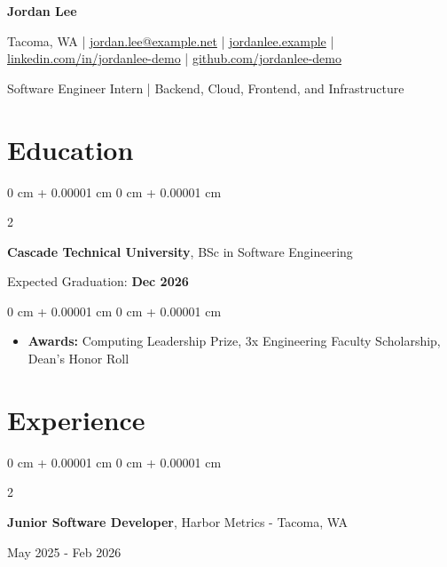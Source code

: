 \documentclass[10pt, letterpaper]{article}
\newenvironment{onecolentry}{
    \begin{adjustwidth}{
        0 cm + 0.00001 cm
    }{
        0 cm + 0.00001 cm
    }
}{
    \end{adjustwidth}
}
\newenvironment{twocolentry}[2][]{
    \onecolentry
    \def\secondColumn{#2}
    \setcolumnwidth{\fill, 6 cm}
    \begin{paracol}{2}
}{
    \switchcolumn \raggedleft \secondColumn
    \end{paracol}
    \endonecolentry
}
\begin{document}
    \begin{center}
        {\fontsize{24pt}{24pt}\selectfont\textbf{Jordan Lee}}

        \vspace{0.2cm}

        Tacoma, WA | \href{mailto:jordan.lee@example.net}{jordan.lee@example.net} | \href{https://jordanlee.example}{jordanlee.example} | \href{https://linkedin.com/in/jordanlee-demo}{linkedin.com/in/jordanlee-demo} | \href{https://github.com/jordanlee-demo}{github.com/jordanlee-demo}

        \vspace{0.1cm}
        Software Engineer Intern | Backend, Cloud, Frontend, and Infrastructure
    \end{center}

    \vspace{0.10 cm}
    \section{Education}

    \begin{twocolentry}{Expected Graduation: \textbf{Dec 2026}}
        \textbf{Cascade Technical University}, BSc in Software Engineering
    \end{twocolentry}

    \vspace{0.10 cm}
    \begin{onecolentry}
        \begin{itemize}[leftmargin=2em, itemsep=1pt, parsep=0pt, topsep=0pt, partopsep=0pt]
            \item \textbf{Awards:} Computing Leadership Prize, 3x Engineering Faculty Scholarship, Dean's Honor Roll
        \end{itemize}
    \end{onecolentry}

    \vspace{0.10 cm}
    \section{Experience}


    \begin{twocolentry}{May 2025 - Feb 2026}
        \textbf{Junior Software Developer}, Harbor Metrics - Tacoma, WA
    \end{twocolentry}
\end{document}
